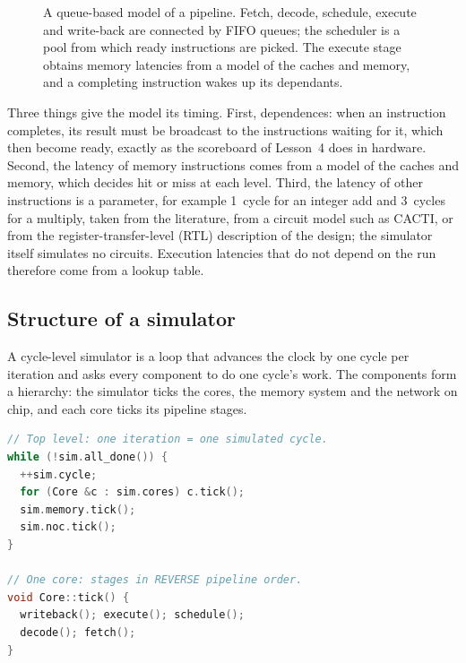 \documentclass[../main.tex]{subfiles}
\begin{document}
\begin{figure}[tb]
  \centering
  
  \caption{A queue-based model of a pipeline.  Fetch, decode,
    schedule, execute and write-back are connected by FIFO queues; the
    scheduler is a pool from which ready instructions are picked.  The
    execute stage obtains memory latencies from a model of the caches
    and memory, and a completing instruction wakes up its dependants.}
  \label{fig:l08-queue-model}
\end{figure}

Three things give the model its timing.  First, dependences: when an
instruction completes, its result must be broadcast to the
instructions waiting for it, which then become ready, exactly as the
scoreboard of Lesson~4 does in hardware.  Second, the latency of memory
instructions comes from a model of the caches and memory, which
decides hit or miss at each level.  Third, the latency of other
instructions is a parameter, for example \num{1}~cycle for an integer
add and \num{3}~cycles for a multiply, taken from the literature,
from a circuit model such as CACTI, or from the register-transfer-level
(RTL) description of the design; the simulator itself simulates no
circuits.  Execution latencies that do not
depend on the run therefore come from a lookup table.

\subsection{Structure of a simulator}

A cycle-level simulator is a loop that advances the clock by one cycle
per iteration and asks every component to do one cycle's work.  The
components form a hierarchy: the simulator ticks the cores, the memory
system and the network on chip, and each core ticks its pipeline
stages.

\begin{lstlisting}[language=C++, numbers=none]
// Top level: one iteration = one simulated cycle.
while (!sim.all_done()) {
  ++sim.cycle;
  for (Core &c : sim.cores) c.tick();
  sim.memory.tick();
  sim.noc.tick();
}

// One core: stages in REVERSE pipeline order.
void Core::tick() {
  writeback(); execute(); schedule();
  decode(); fetch();
}
\end{lstlisting}
\end{document}
